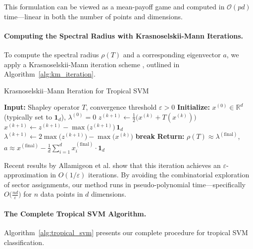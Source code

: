 \documentclass{article}
\newcommand{\R}{\mathbb{R}}
\begin{document}
This formulation can be viewed as a mean-payoff game \cite{akian2020} and computed in $\mathcal{O}(pd)$ time—linear in both the number of points and dimensions.

\paragraph{Computing the Spectral Radius with Krasnoselskii-Mann Iterations.}
\label{subsec:spectral_computation}
To compute the spectral radius $\rho(T)$ and a corresponding eigenvector $a$, we apply a Krasnoselskii-Mann iteration scheme \cite{nussbaum1986, gaubert2004}, outlined in Algorithm~\ref{alg:km_iteration}.

\begin{algorithm}
\caption{Krasnoselskii--Mann Iteration for Tropical SVM}\label{alg:km_iteration}
\begin{algorithmic}[1]
\STATE \textbf{Input:} Shapley operator $T$, convergence threshold $\varepsilon > 0$
\STATE \textbf{Initialize:} $x^{(0)} \in \R^d$ (typically set to $\mathbf{1}_d$), $\lambda^{(0)} = 0$
  \STATE $z^{(k+1)} \leftarrow \frac{1}{2}\bigl(x^{(k)} + T(x^{(k)})\bigr)$ 
  \STATE $x^{(k+1)} \leftarrow z^{(k+1)} - \max\bigl(z^{(k+1)}\bigr)\,\mathbf{1}_d$ 
  \STATE $\lambda^{(k+1)} \leftarrow 2\max\bigl(z^{(k+1)}\bigr) - \max\bigl(x^{(k)}\bigr)$ 
    \STATE \textbf{break}
  \ENDIF
\ENDFOR
\STATE \textbf{Return:} $\rho(T) \approx \lambda^{(\text{final})}$, $a \approx x^{(\text{final})} - \frac{1}{d}\sum_{i=1}^d x_i^{(\text{final})} \cdot \mathbf{1}_d$
\end{algorithmic}
\end{algorithm}

Recent results by Allamigeon et al. \cite{allamigeon2025} show that this iteration achieves an $\varepsilon$-approximation in $O(1/\varepsilon)$ iterations. By avoiding the combinatorial exploration of sector assignments, our method runs in pseudo-polynomial time—specifically $O\bigl(\frac{nd}{\varepsilon}\bigr)$ for $n$ data points in $d$ dimensions.

\paragraph{The Complete Tropical SVM Algorithm.}\label{subsec:complete_algorithm}
Algorithm~\ref{alg:tropical_svm} presents our complete procedure for tropical SVM classification.
\end{document}

